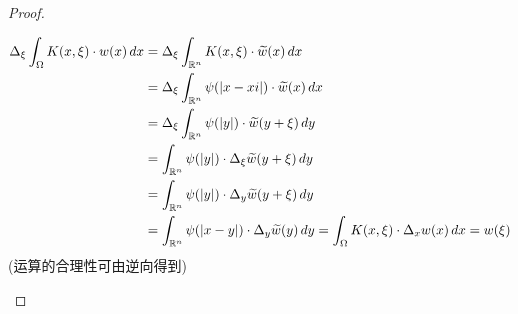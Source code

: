 \begin{proposition}
\begin{proof}
\begin{enumerate}
				\begin{align*}
					\Delta_{\xi} \int_{\Omega} K(x , \xi) \cdot w(x) \, dx 
					&= \Delta_{\xi} \int_{\mathbb{R}^n} K(x , \xi) \cdot \widetilde{w}(x) \, dx \\
					&= \Delta_{\xi} \int_{\mathbb{R}^n} \psi(| x - xi |) \cdot \widetilde{w}(x) \, dx \\
					&= \Delta_{\xi} \int_{\mathbb{R}^n} \psi(| y |) \cdot \widetilde{w}(y + \xi) \, dy \\
					&= \int_{\mathbb{R}^n} \psi(| y |) \cdot \Delta_{\xi} \widetilde{w}(y + \xi) \, dy \\
					&= \int_{\mathbb{R}^n} \psi(| y |) \cdot \Delta_y \widetilde{w}(y + \xi) \, dy \\
					&= \int_{\mathbb{R}^n} \psi(| x - y |) \cdot \Delta_y \widetilde{w}(y) \, dy 
					= \int_{\Omega} K(x , \xi) \cdot \Delta_x w(x) \, dx
					= w(\xi)
				\end{align*}
				(运算的合理性可由逆向得到)
				
				\vspace{2.5em}
				

\end{enumerate}
\end{proof}
\end{proposition}
